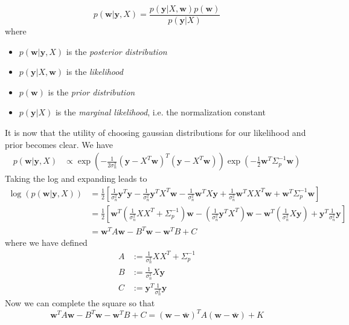 \begin{equation}
  p(\mathbf{w}\vert \mathbf{y}, X) = \dfrac{p(\mathbf{y}\vert X, \mathbf{w})p(\mathbf{w})}{p(\mathbf{y}\vert X)}
\end{equation}
where
\begin{itemize}[noitemsep, nolistsep]
\item $p(\mathbf{w}\vert \mathbf{y}, X)$ is the \textit{posterior distribution}
\item $p(\mathbf{y}\vert X, \mathbf{w})$ is the \textit{likelihood}
\item $p(\mathbf{w})$ is the \textit{prior distribution}
\item $p(\mathbf{y} \vert X)$ is the \textit{marginal likelihood}, i.e. the normalization constant
\end{itemize}
It is now that the utility of choosing gaussian distributions for our likelihood and prior becomes clear. We have
\begin{align}
  p(\mathbf{w}\vert\mathbf{y},X) &\propto \exp\left(-\frac{1}{2\sigma_n^2}(\mathbf{y}-X^T\mathbf{w})^T(\mathbf{y}-X^T\mathbf{w}) \right)\exp\left(-\frac{1}{2}\mathbf{w}^T\Sigma_p^{-1}\mathbf{w}\right)
\end{align}
Taking the log and expanding leads to
\begin{align}
  \log(p(\mathbf{w}\vert \mathbf{y}, X))&= \frac{1}{2}\left[ \frac{1}{\sigma_n^2}\mathbf{y}^T\mathbf{y} - \frac{1}{\sigma_n^2}\mathbf{y}^TX^T\mathbf{w} - \frac{1}{\sigma_n^2}\mathbf{w}^TX\mathbf{y} + \frac{1}{\sigma_n^2}\mathbf{w}^TXX^T\mathbf{w} + \mathbf{w}^T\Sigma_p^{-1}\mathbf{w}\right] \\
  &= \frac{1}{2}\left[ \mathbf{w}^T\left(\frac{1}{\sigma_n^2}XX^T+\Sigma_p^{-1}\right)\mathbf{w} -\left(\frac{1}{\sigma_n^2}\mathbf{y}^TX^T\right)\mathbf{w} - \mathbf{w}^T\left(\frac{1}{\sigma_n^2}X\mathbf{y}\right)  + \mathbf{y}^T\frac{1}{\sigma_n^2}\mathbf{y}\right]\\
  &= \mathbf{w}^TA\mathbf{w} - B^T\mathbf{w} - \mathbf{w}^TB + C
\end{align}
where we have defined
\begin{align}
    A &:= \frac{1}{\sigma_n^2}XX^T + \Sigma_p^{-1} \\
    B &:= \frac{1}{\sigma_n^2}X\mathbf{y} \\
    C &:= \mathbf{y}^T\frac{1}{\sigma_n^2}\mathbf{y}
\end{align}
Now we can complete the square so that
\begin{equation}
    \mathbf{w}^TA\mathbf{w} - B^T\mathbf{w} - \mathbf{w}^TB + C = \left(\mathbf{w} - \bar{\mathbf{w}} \right)^TA\left(\mathbf{w} - \bar{\mathbf{w}} \right) + K
    \end{equation}
